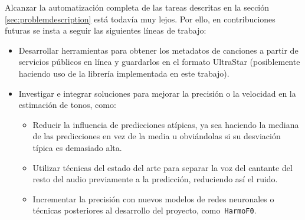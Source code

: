 Alcanzar la automatización completa de las tareas descritas en la sección \ref{sec:problemdescription} está todavía muy lejos. Por ello, en contribuciones futuras se insta a seguir las siguientes líneas de trabajo:

\begin{itemize}
	\item{Desarrollar herramientas para obtener los metadatos de canciones a partir de servicios públicos en línea y guardarlos en el formato UltraStar (posiblemente haciendo uso de la librería implementada en este trabajo).}
	\item{Investigar e integrar soluciones para mejorar la precisión o la velocidad en la estimación de tonos, como:
	\begin{itemize}
		\item{Reducir la influencia de predicciones atípicas, ya sea haciendo la mediana de las predicciones en vez de la media u obviándolas si su desviación típica es demasiado alta.}
		\item{Utilizar técnicas del estado del arte para separar la voz del cantante del resto del audio previamente a la predicción, reduciendo así el ruido.}
		\item{Incrementar la precisión con nuevos modelos de redes neuronales o técnicas posteriores al desarrollo del proyecto, como\texttt{ HarmoF0}\cite{harmof0}.}
	\end{itemize}
	}
\end{itemize}
